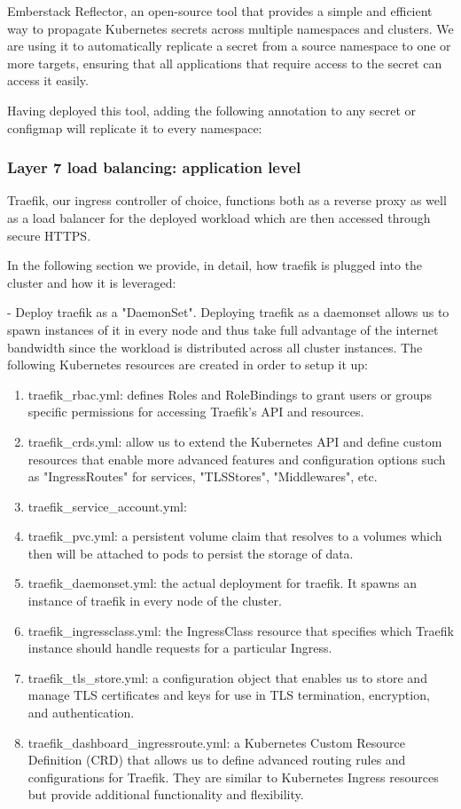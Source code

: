 Emberstack Reflector, an open-source tool that provides a simple and efficient way to propagate Kubernetes secrets across multiple namespaces and clusters. We are using it to automatically replicate a secret from a source namespace to one or more targets, ensuring that all applications that require access to the secret can access it easily.

Having deployed this tool, adding the following annotation to any secret or configmap will replicate it to every namespace:


\subsubsection{Layer 7 load balancing: application level }

Traefik, our ingress controller of choice, functions both as a reverse proxy as well as a load balancer for the deployed workload which are then accessed through secure HTTPS. 

In the following section we provide, in detail, how traefik is plugged into the cluster and how it is leveraged: 

- Deploy traefik as a "DaemonSet". Deploying traefik as a daemonset allows us to spawn instances of it in every node and thus take full advantage of the internet bandwidth since the workload is distributed across all cluster instances. The following Kubernetes resources are created in order to setup it up:

\begin{enumerate}
\item traefik\_rbac.yml: defines Roles and RoleBindings to grant users or groups specific permissions for accessing Traefik's API and resources.
\item traefik\_crds.yml: allow us to extend the Kubernetes API and define custom resources that enable more advanced features and configuration options such as "IngressRoutes" for services, "TLSStores", "Middlewares", etc.
\item traefik\_service\_account.yml:  
\item traefik\_pvc.yml:  a persistent volume claim that resolves to a volumes which then will be attached to pods to persist the storage of data. 
\item traefik\_daemonset.yml: the actual deployment for traefik. It spawns an instance of traefik in every node of the cluster. 
\item traefik\_ingressclass.yml: the IngressClass resource that specifies which Traefik instance should handle requests for a particular Ingress. 
\item traefik\_tls\_store.yml: a configuration object that enables us to store and manage TLS certificates and keys for use in TLS termination, encryption, and authentication. 
\item traefik\_dashboard\_ingressroute.yml: a Kubernetes Custom Resource Definition (CRD) that allows us to define advanced routing rules and configurations for Traefik. They are similar to Kubernetes Ingress resources but provide additional functionality and flexibility. 
\end{enumerate}


